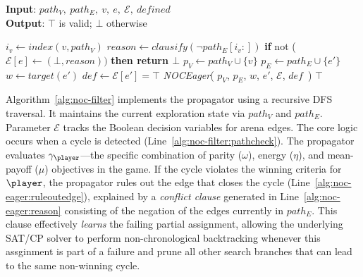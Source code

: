 \documentclass[runningheads]{llncs}
\begin{document}
\begin{algorithm}[htb]
\small
\caption{\textbf{\textit{NOCFilter}}}
\textbf{Input}: $path_V,\ path_E,\ v,\ e,\ \mathcal{E},\ \textit{defined}$ \\
\textbf{Output}: $\top$ is valid; $\bot$ otherwise
\begin{algorithmic}[1]
     \label{alg:noc-filter:pathcheck}
        \STATE $i_v \gets \textit{index}(v, path_V)$
        \IF{$\neg \gamma_{\player}$} \label{alg:noc-filter:condition}
            \STATE $\textit{reason} \gets \textit{clausify}(\neg path_E[i_v:])$ \label{alg:noc-eager:reason}
            \STATE \textbf{if }not ($\mathcal{E}[e] \gets (\bot, \textit{reason}))$ \textbf{then return $\bot$} \label{alg:noc-eager:ruleoutedge}
        \ENDIF
     \label{alg:noc-eager:defcheck}
         \label{alg:no-opponent-cycle-f1:edgecheck}
            \STATE $p_V \gets path_V \cup \{v\}$
            \STATE $p_E \gets path_E \cup \{e'\}$
            \STATE $w \gets \textit{target}(e')$
            \STATE $\textit{def} \gets \mathcal{E}[e'] = \top$
            \STATE \textit{NOCEager}(
                $p_V$,
                $p_E$,
                $w$,
                $e'$,
                $\mathcal{E}$,
                $\textit{def}$\ )
        \ENDFOR
    \ENDIF
    \RETURN $\top$
\end{algorithmic}
\label{alg:noc-filter}
\end{algorithm}

Algorithm~\ref{alg:noc-filter} implements the \noc propagator using a recursive DFS traversal. It maintains the current exploration state via $path_V$ and $path_E$. Parameter $\mathcal{E}$ tracks the Boolean decision variables for arena edges. The core logic occurs when a cycle is detected (Line~\ref{alg:noc-filter:pathcheck}). The propagator evaluates $\gamma_{\player}$---the specific combination of parity ($\omega$), energy ($\eta$), and mean-payoff ($\mu$) objectives in the game. 
%
If the cycle violates the winning criteria for $\player$, the propagator rules out the edge that closes the cycle (Line~\ref{alg:noc-eager:ruleoutedge}), explained by a \textit{conflict clause} generated in Line~\ref{alg:noc-eager:reason} consisting of the negation of the edges currently in $path_E$. This clause effectively {\em learns} the failing partial assignment, allowing the underlying SAT/CP solver to perform non-chronological backtracking whenever this assginment is part of a failure and prune all other search branches that can lead to the same non-winning cycle.
\end{document}

